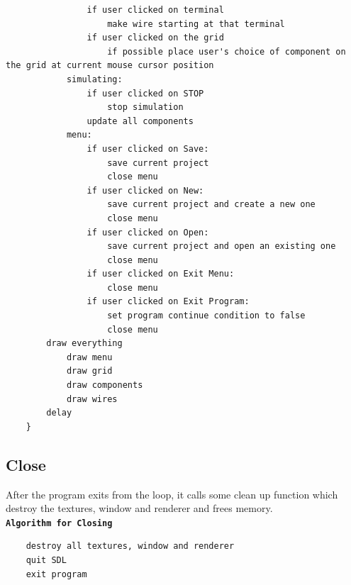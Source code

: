 \documentclass[report]{subfiles}
\begin{document}
\begin{verbatim}
                if user clicked on terminal
                    make wire starting at that terminal
                if user clicked on the grid
                    if possible place user's choice of component on the grid at current mouse cursor position
            simulating:
                if user clicked on STOP
                    stop simulation
                update all components
            menu:
                if user clicked on Save:
                    save current project
                    close menu
                if user clicked on New:
                    save current project and create a new one
                    close menu
                if user clicked on Open:
                    save current project and open an existing one
                    close menu
                if user clicked on Exit Menu:
                    close menu
                if user clicked on Exit Program:
                    set program continue condition to false 
                    close menu
        draw everything
            draw menu
            draw grid
            draw components
            draw wires
        delay
    }
        \end{verbatim}
    \subsection{Close}
    After the program exits from the loop, it calls some clean up function which destroy the textures, window and renderer and frees memory.\\
        \textbf{\texttt{Algorithm for Closing}}
        \begin{verbatim}
    destroy all textures, window and renderer
    quit SDL
    exit program
        \end{verbatim}
\end{document}

